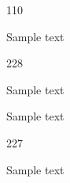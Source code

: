 \documentclass{article}
\newcommand{\itemcolor}[1]{%
                            \renewcommand{\makelabel}[1]{\color{#1}\hfil ##1}}
\begin{document}
\begin{dinglist}{110}
\itemcolor{myblue}
\item Sample text
    \begin{dinglist}{228}
    \itemcolor{green!70}
    \item Sample text
    \itemcolor{red!50}
    \item Sample text
        \begin{dinglist}{227}
        \item Sample text
        \end{dinglist}
    \end{dinglist}
\end{dinglist}
\end{document}

